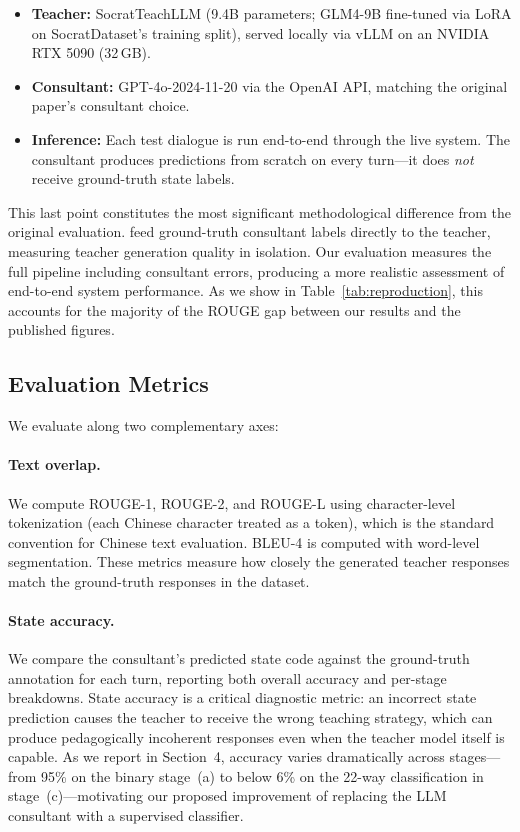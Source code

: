 \documentclass[11pt]{article}
\begin{document}
\begin{itemize}
    \item \textbf{Teacher:} SocratTeachLLM (9.4B parameters; GLM4-9B \citep{glm2024chatglm} fine-tuned via LoRA \citep{hu2022lora} on SocratDataset's training split), served locally via vLLM \citep{kwon2023vllm} on an NVIDIA RTX 5090 (32\,GB).
    \item \textbf{Consultant:} GPT-4o-2024-11-20 \citep{openai2024gpt4o} via the OpenAI API, matching the original paper's consultant choice.
    \item \textbf{Inference:} Each test dialogue is run end-to-end through the live system. The consultant produces predictions from scratch on every turn---it does \emph{not} receive ground-truth state labels.
\end{itemize}

\noindent This last point constitutes the most significant methodological difference from the original evaluation. \citet{peng2025kele} feed ground-truth consultant labels directly to the teacher, measuring teacher generation quality in isolation. Our evaluation measures the full pipeline including consultant errors, producing a more realistic assessment of end-to-end system performance. As we show in Table~\ref{tab:reproduction}, this accounts for the majority of the ROUGE gap between our results and the published figures.

\subsection{Evaluation Metrics}

We evaluate along two complementary axes:

\paragraph{Text overlap.} We compute ROUGE-1, ROUGE-2, and ROUGE-L \citep{lin2004rouge} using character-level tokenization (each Chinese character treated as a token), which is the standard convention for Chinese text evaluation. BLEU-4 \citep{papineni2002bleu} is computed with word-level segmentation. These metrics measure how closely the generated teacher responses match the ground-truth responses in the dataset.

\paragraph{State accuracy.} We compare the consultant's predicted state code against the ground-truth annotation for each turn, reporting both overall accuracy and per-stage breakdowns. State accuracy is a critical diagnostic metric: an incorrect state prediction causes the teacher to receive the wrong teaching strategy, which can produce pedagogically incoherent responses even when the teacher model itself is capable. As we report in Section~4, accuracy varies dramatically across stages---from 95\% on the binary stage~(a) to below 6\% on the 22-way classification in stage~(c)---motivating our proposed improvement of replacing the LLM consultant with a supervised classifier.
\end{document}
